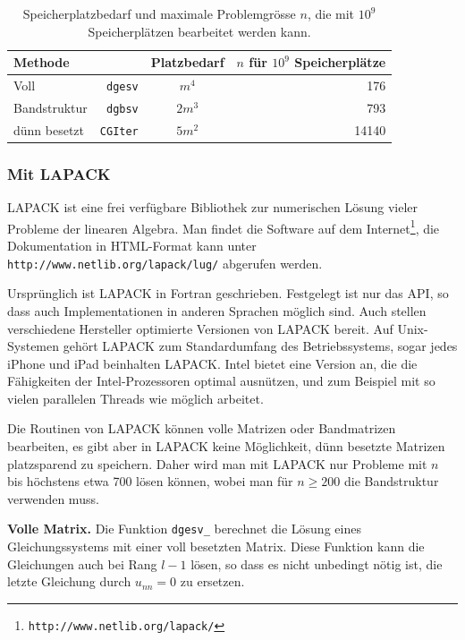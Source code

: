 \begin{table}
\begin{center}
\begin{tabular}{|lr|c|r|}
\hline
Methode&&Platzbedarf&$n$ für $10^9$ Speicherplätze\\
\hline
Voll&{\tt dgesv}&$m^4$&176\\
Bandstruktur&{\tt dgbsv}&$2m^3$&793\\
dünn besetzt&{\tt CGIter}&$5m^2$&14140\\
\hline
\end{tabular}
\end{center}
\caption{Speicherplatzbedarf und maximale Problemgrösse $n$, die mit $10^9$
Speicherplätzen bearbeitet werden kann.\label{bedarf}}
\end{table}

\subsubsection{Mit LAPACK}
LAPACK ist eine frei verfügbare Bibliothek zur numerischen Lösung 
vieler Probleme der linearen Algebra. 
Man findet die Software auf dem Internet\footnote{\small\tt http://www.netlib.org/lapack/}, die Dokumentation in HTML-Format
kann unter
{\small\tt http://www.netlib.org/lapack/lug/} abgerufen werden.

Ursprünglich ist LAPACK in Fortran geschrieben.
Festgelegt ist nur das API,
so dass auch Implementationen in anderen Sprachen möglich sind.
Auch stellen verschiedene
Hersteller optimierte Versionen von LAPACK bereit.
Auf Unix-Systemen gehört LAPACK zum Standardumfang
des Betriebssystems, sogar jedes iPhone und iPad beinhalten LAPACK.
Intel bietet eine Version an, die die Fähigkeiten der Intel-Prozessoren
optimal ausnützen, und zum Beispiel mit so vielen parallelen Threads
wie möglich arbeitet.

Die Routinen von LAPACK können volle Matrizen oder Bandmatrizen
bearbeiten, es gibt aber in LAPACK keine Möglichkeit, dünn besetzte
Matrizen platzsparend zu speichern. Daher wird man mit LAPACK nur Probleme
mit $n$ bis höchstens etwa 700 lösen können, wobei man für $n\ge 200$
die Bandstruktur verwenden muss.

\medskip
{\parindent0pt
{\bf Volle Matrix.}}
Die Funktion {\tt dgesv\_} berechnet die Lösung eines Gleichungssystems mit 
einer voll besetzten Matrix. Diese Funktion kann die Gleichungen auch
bei Rang $l-1$ lösen, so dass es nicht unbedingt nötig ist, die letzte
Gleichung durch $u_{nn}=0$ zu ersetzen.

